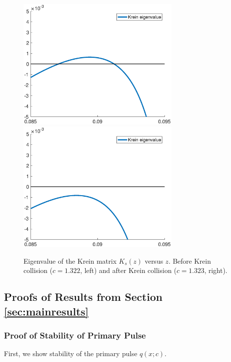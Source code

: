 \documentclass[12pt]{article}
\begin{document}
\begin{figure}[H]
\centering
\includegraphics[width=8cm]{Kreineigbefore.eps}
\includegraphics[width=8cm]{Kreineigafter.eps}
\caption{Eigenvalue of the Krein matrix $K_s(z)$ versus $z$. Before Krein collision ($c = 1.322$, left) and after Krein collision ($c = 1.323$, right).}
\label{fig:KScollision}
\end{figure}
 
\subsection{Proofs of Results from Section \ref{sec:mainresults}}\label{sec:proofs}

\subsubsection{Proof of Stability of Primary Pulse}

First, we show stability of the primary pulse $q(x; c)$.

\end{document}

